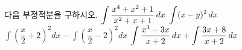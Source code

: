다음 부정적분을 구하시오.
 $\displaystyle\int \dfrac{x^4+x^2+1}{x^2+x+1}\mkern3mu dx$
 $\displaystyle\int (x-y)^2\mkern3mu dx$
 $\displaystyle\int \left(\dfrac{x}{2}+2\right)^{2}dx-\int \left(\dfrac{x}{2}-2\right)^{2}dx$
 $\displaystyle\int \dfrac{x^3-3x}{x+2}\mkern3mu dx+\int \dfrac{3x+8}{x+2}\mkern3mu dx$
